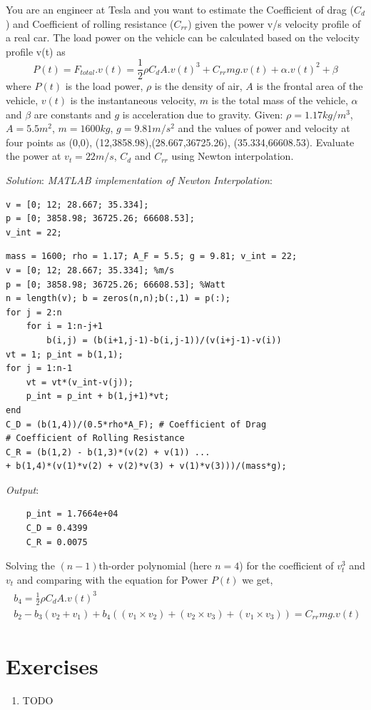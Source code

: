 \documentclass[book.tex]{subfiles}
\begin{document}
\begin{example} You are an engineer at Tesla and you want to estimate the Coefficient of drag ($C_d$) and Coefficient of rolling resistance ($C_{rr}$) given the power v/s velocity profile of a real car. The load power on the vehicle can be calculated based on the velocity profile v(t) as
\begin{equation*}
P(t) = F_{total}.v(t) = \frac{1}{2}\rho C_dA.v(t)^3 + C_{rr}mg.v(t) + \alpha.v(t)^2 + \beta
\end{equation*}
where $P(t)$ is the load power, $\rho$ is the density of air, $A$ is the frontal area of the vehicle, $v(t)$ is the instantaneous velocity, $m$ is the total mass of the vehicle, $\alpha$ and $\beta$ are constants and $g$ is acceleration due to gravity. Given: $\rho = 1.17 kg/m^3$, $A = 5.5 m^2$, $m = 1600 kg$, $g = 9.81 m/s^2$ and the values of power and velocity at four points as (0,0), (12,3858.98),(28.667,36725.26), (35.334,66608.53).  Evaluate the power at $v_t = 22 m/s$, $C_d$ and $C_{rr}$ using Newton interpolation. 

\textit{Solution}: \textit{MATLAB implementation of Newton Interpolation}: 
\begin{marginfigure}[5\baselineskip]
\begin{Verbatim}
v = [0; 12; 28.667; 35.334]; 
p = [0; 3858.98; 36725.26; 66608.53];
v_int = 22; 
\end{Verbatim}
\end{marginfigure}
\begin{Verbatim}
mass = 1600; rho = 1.17; A_F = 5.5; g = 9.81; v_int = 22;
v = [0; 12; 28.667; 35.334]; %m/s
p = [0; 3858.98; 36725.26; 66608.53]; %Watt
n = length(v); b = zeros(n,n);b(:,1) = p(:); 
for j = 2:n
	for i = 1:n-j+1
		b(i,j) = (b(i+1,j-1)-b(i,j-1))/(v(i+j-1)-v(i))
vt = 1; p_int = b(1,1);
for j = 1:n-1
	vt = vt*(v_int-v(j));
	p_int = p_int + b(1,j+1)*vt;
end
C_D = (b(1,4))/(0.5*rho*A_F); # Coefficient of Drag
# Coefficient of Rolling Resistance
C_R = (b(1,2) - b(1,3)*(v(2) + v(1)) ...
+ b(1,4)*(v(1)*v(2) + v(2)*v(3) + v(1)*v(3)))/(mass*g);
\end{Verbatim}
\begin{marginfigure}[-5\baselineskip]
	\textit{Output}: 
	\begin{Verbatim}
    p_int = 1.7664e+04
    C_D = 0.4399
    C_R = 0.0075
	\end{Verbatim}
\end{marginfigure}
Solving the $(n-1)$th-order polynomial (here $n=4$) for the coefficient of $v_t^3$ and $v_t$ and comparing with the equation for Power $P(t)$ we get,
\begin{align}
\begin{gathered}
b_4 = \frac{1}{2}\rho C_dA.v(t)^3 \\
b_2 - b_3(v_2 + v_1) + b_4((v_1 \times v_2) + (v_2 \times v_3) + (v_1 \times v_3)) = C_{rr}mg.v(t) 
\end{gathered}
\end{align}
\end{example}
\section{Exercises}
\begin{enumerate}
    \item TODO
\end{enumerate}
\end{document}
